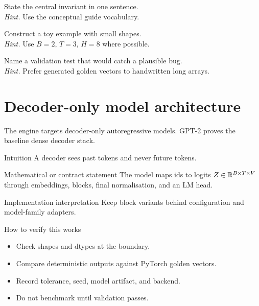 \begin{chapterexercises}
\item State the central invariant in one sentence.\\
\textit{Hint.} Use the conceptual guide vocabulary.
\item Construct a toy example with small shapes.\\
\textit{Hint.} Use $B=2$, $T=3$, $H=8$ where possible.
\item Name a validation test that would catch a plausible bug.\\
\textit{Hint.} Prefer generated golden vectors to handwritten long arrays.
\end{chapterexercises}

\chapter{Decoder-only model architecture}
\label{ch:decoder-only}
The engine targets decoder-only autoregressive models. GPT-2 proves the baseline dense decoder stack.



\begin{intuitionbox}{Intuition}
A decoder sees past tokens and never future tokens.
\end{intuitionbox}

\begin{definitionbox}{Mathematical or contract statement}
The model maps ids to logits $Z\in\mathbb{R}^{B\times T\times V}$ through embeddings, blocks, final normalisation, and an LM head.
\end{definitionbox}

\begin{implementationbox}{Implementation interpretation}
Keep block variants behind configuration and model-family adapters.
\end{implementationbox}

\begin{verificationbox}{How to verify this works}
\begin{itemize}
\item Check shapes and dtypes at the boundary.
\item Compare deterministic outputs against PyTorch golden vectors.
\item Record tolerance, seed, model artifact, and backend.
\item Do not benchmark until validation passes.
\end{itemize}
\end{verificationbox}

